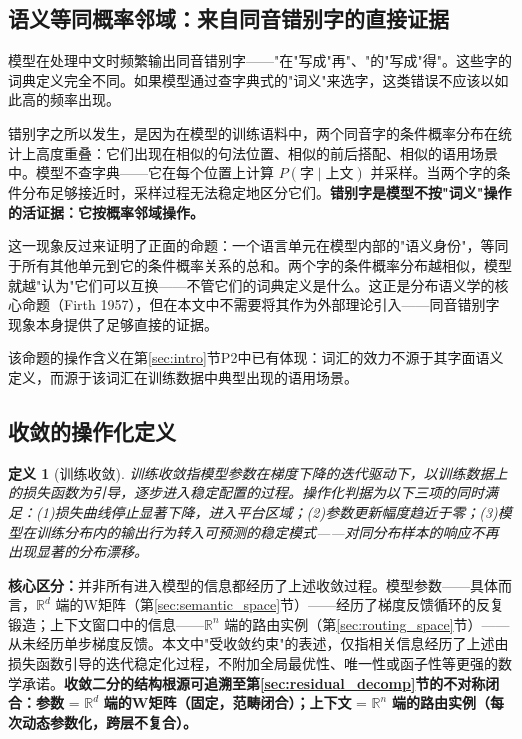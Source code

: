 \documentclass[11pt,a4paper]{article}
\newtheorem{definition}[theorem]{定义}
\theoremstyle{definition}
\begin{document}
\subsection{语义等同概率邻域：来自同音错别字的直接证据}
\label{sec:typo_evidence}

模型在处理中文时频繁输出同音错别字——"在"写成"再"、"的"写成"得"。这些字的词典定义完全不同。如果模型通过查字典式的"词义"来选字，这类错误不应该以如此高的频率出现。

错别字之所以发生，是因为在模型的训练语料中，两个同音字的条件概率分布在统计上高度重叠：它们出现在相似的句法位置、相似的前后搭配、相似的语用场景中。模型不查字典——它在每个位置上计算 $P(\text{字} \mid \text{上文})$ 并采样。当两个字的条件分布足够接近时，采样过程无法稳定地区分它们。\textbf{错别字是模型不按"词义"操作的活证据：它按概率邻域操作。}

这一现象反过来证明了正面的命题：一个语言单元在模型内部的"语义身份"，等同于所有其他单元到它的条件概率关系的总和。两个字的条件概率分布越相似，模型就越"认为"它们可以互换——不管它们的词典定义是什么。这正是分布语义学的核心命题（Firth 1957），但在本文中不需要将其作为外部理论引入——同音错别字现象本身提供了足够直接的证据。

该命题的操作含义在第\ref{sec:intro}节P2中已有体现：词汇的效力不源于其字面语义定义，而源于该词汇在训练数据中典型出现的语用场景。

\subsection{收敛的操作化定义}
\label{sec:convergence_def}

\begin{definition}[训练收敛]
训练收敛指模型参数在梯度下降的迭代驱动下，以训练数据上的损失函数为引导，逐步进入稳定配置的过程。操作化判据为以下三项的同时满足：(1)损失曲线停止显著下降，进入平台区域；(2)参数更新幅度趋近于零；(3)模型在训练分布内的输出行为转入可预测的稳定模式——对同分布样本的响应不再出现显著的分布漂移。
\end{definition}

\textbf{核心区分：}并非所有进入模型的信息都经历了上述收敛过程。模型参数——具体而言，$\mathbb{R}^d$ 端的W矩阵（第\ref{sec:semantic_space}节）——经历了梯度反馈循环的反复锻造；上下文窗口中的信息——$\mathbb{R}^n$ 端的路由实例（第\ref{sec:routing_space}节）——从未经历单步梯度反馈。本文中"受收敛约束"的表述，仅指相关信息经历了上述由损失函数引导的迭代稳定化过程，不附加全局最优性、唯一性或函子性等更强的数学承诺。\textbf{收敛二分的结构根源可追溯至第\ref{sec:residual_decomp}节的不对称闭合：参数} = $\mathbb{R}^d$ \textbf{端的W矩阵（固定，范畴闭合）；上下文} = $\mathbb{R}^n$ \textbf{端的路由实例（每次动态参数化，跨层不复合）。}
\end{document}
